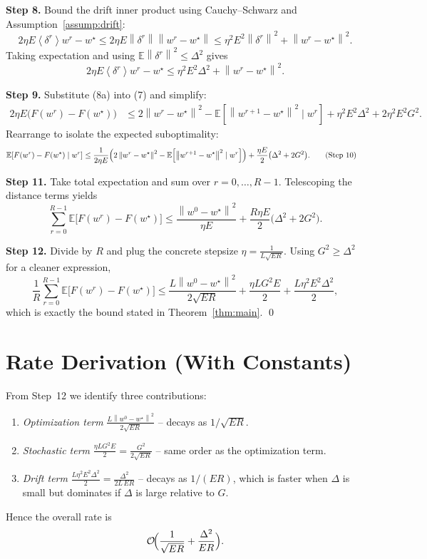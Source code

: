 \documentclass[11pt]{article}
\newcommand{\E}{\mathbb{E}}
\newcommand{\norm}[1]{\left\|#1\right\|}
\newcommand{\inner}[1]{\left\langle#1\right\rangle}
\begin{document}
\noindent\textbf{Step 8.}  Bound the drift inner product using Cauchy–Schwarz and Assumption~\ref{assump:drift}:
\[
2\eta E\inner{\delta^{r}}{w^{r}-w^{\star}}
\le 2\eta E\norm{\delta^{r}}\norm{w^{r}-w^{\star}}
\le \eta^{2}E^{2}\norm{\delta^{r}}^{2}+ \norm{w^{r}-w^{\star}}^{2}.
\tag{Step 8}
\]
Taking expectation and using $\E\norm{\delta^{r}}^{2}\le\Delta^{2}$ gives
\[
2\eta E\inner{\delta^{r}}{w^{r}-w^{\star}}
\le \eta^{2}E^{2}\Delta^{2}+ \norm{w^{r}-w^{\star}}^{2}.
\tag{Step 8a}
\]

\noindent\textbf{Step 9.}  Substitute (8a) into (7) and simplify:
\begin{align}
2\eta E\bigl(F(w^{r})-F(w^{\star})\bigr)
&\le 2\norm{w^{r}-w^{\star}}^{2}
   -\E\!\left[\norm{w^{r+1}-w^{\star}}^{2}\mid w^{r}\right]
   +\eta^{2}E^{2}\Delta^{2}
   +2\eta^{2}E^{2}G^{2}.
\tag{Step 9}
\end{align}
Rearrange to isolate the expected suboptimality:
\begin{align}
\E\!\left[F(w^{r})-F(w^{\star})\mid w^{r}\right]
&\le \frac{1}{2\eta E}\Bigl(2\norm{w^{r}-w^{\star}}^{2}
   -\E\!\left[\norm{w^{r+1}-w^{\star}}^{2}\mid w^{r}\right]\Bigr)
   +\frac{\eta E}{2}\bigl(\Delta^{2}+2G^{2}\bigr).
\tag{Step 10}
\end{align}

\noindent\textbf{Step 11.}  Take total expectation and sum over $r=0,\dots,R-1$.
Telescoping the distance terms yields
\[
\sum_{r=0}^{R-1}\E\!\bigl[F(w^{r})-F(w^{\star})\bigr]
\le \frac{\norm{w^{0}-w^{\star}}^{2}}{\eta E}
   +\frac{R\eta E}{2}\bigl(\Delta^{2}+2G^{2}\bigr).
\tag{Step 11}
\]

\noindent\textbf{Step 12.}  Divide by $R$ and plug the concrete stepsize $\eta=\frac{1}{L\sqrt{E R}}$.
Using $G^{2}\ge \Delta^{2}$ for a cleaner expression,
\[
\frac{1}{R}\sum_{r=0}^{R-1}\E\!\bigl[F(w^{r})-F(w^{\star})\bigr]
\le \frac{L\norm{w^{0}-w^{\star}}^{2}}{2\sqrt{E R}}
   +\frac{\eta L G^{2}E}{2}
   +\frac{L\eta^{2}E^{2}\Delta^{2}}{2},
\]
which is exactly the bound stated in Theorem~\ref{thm:main}. \qed

\section*{Rate Derivation (With Constants)}
From Step~12 we identify three contributions:
\begin{enumerate}[label=\arabic*.]
\item \emph{Optimization term} $ \displaystyle \frac{L\norm{w^{0}-w^{\star}}^{2}}{2\sqrt{E R}}$ – decays as $1/\sqrt{ER}$.
\item \emph{Stochastic term} $ \displaystyle \frac{\eta L G^{2}E}{2}= \frac{G^{2}}{2\sqrt{E R}}$ – same order as the optimization term.
\item \emph{Drift term} $ \displaystyle \frac{L\eta^{2}E^{2}\Delta^{2}}{2}= \frac{\Delta^{2}}{2L\,ER}$ – decays as $1/(ER)$, which is faster when $\Delta$ is small but dominates if $\Delta$ is large relative to $G$.
\end{enumerate}
Hence the overall rate is
\[
\mathcal{O}\!\Bigl(\frac{1}{\sqrt{E R}}+\frac{\Delta^{2}}{ER}\Bigr).
\]
\end{document}
